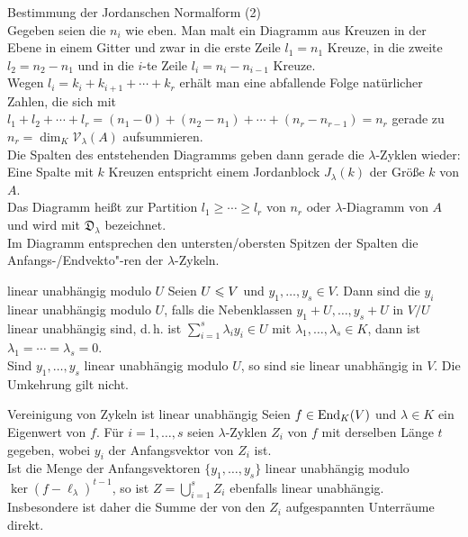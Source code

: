 \begin{Prozedur}{Bestimmung der Jordanschen Normalform (2)} \\
    Gegeben seien die $n_i$ wie eben.
    Man malt ein Diagramm aus Kreuzen in der Ebene in einem Gitter
    und zwar in die erste Zeile $l_1 = n_1$ Kreuze, in die zweite
    $l_2 = n_2 - n_1$ und in die $i$-te Zeile
    $l_i = n_i - n_{i-1}$ Kreuze. \\
    Wegen $l_i = k_i + k_{i+1} + \dotsb + k_r$ erhält man eine abfallende
    Folge natürlicher Zahlen, die sich mit $l_1 + l_2 + \dotsb + l_r =
    (n_1 - 0) + (n_2 - n_1) + \dotsb + (n_r - n_{r-1}) = n_r$ gerade zu
    $n_r = \dim_K \mathcal{V}_\lambda(A)$ aufsummieren. \\
    Die Spalten des entstehenden Diagramms geben dann gerade
    die $\lambda$-Zyklen wieder:
    Eine Spalte mit $k$ Kreuzen entspricht einem Jordanblock $J_\lambda(k)$
    der Größe $k$ von $A$. \\
    Das Diagramm heißt 
    zur Partition $l_1 \ge \dotsb \ge l_r$ von $n_r$ oder
    $\lambda$-Diagramm von $A$ und wird mit $\mathfrak{D}_\lambda$
    bezeichnet. \\
    Im Diagramm entsprechen den untersten/obersten Spitzen der Spalten
    die Anfangs-/Endvekto"-ren der $\lambda$-Zykeln.
\end{Prozedur}

\begin{Def}{linear unabhängig modulo $U$}
    Seien $U \leqslant V$ und $y_1, \dotsc, y_s \in V$.
    Dann sind die $y_i$ linear unabhängig modulo $U$, falls die
    Nebenklassen $y_1 + U, \dotsc, y_s + U$ in $V/U$ linear unabhängig sind,
    d.\,h. ist $\sum_{i=1}^s \lambda_i y_i \in U$ mit
    $\lambda_1, \dotsc, \lambda_s \in K$, dann ist
    $\lambda_1 = \dotsb = \lambda_s = 0$. \\
    Sind $y_1, \dotsc, y_s$ linear unabhängig modulo $U$, so sind sie
    linear unabhängig in $V$.
    Die Umkehrung gilt nicht.
\end{Def}

\begin{Satz}{Vereinigung von Zykeln ist linear unabhängig}
    Seien $f \in \operatorname{End}_K(V)$ und $\lambda \in K$ ein Eigenwert von $f$.
    Für $i = 1, \dotsc, s$ seien $\lambda$-Zyklen $Z_i$ von $f$ mit derselben
    Länge $t$ gegeben, wobei $y_i$ der Anfangsvektor von $Z_i$ ist. \\
    Ist die Menge der Anfangsvektoren $\{y_1, \dotsc, y_s\}$ linear
    unabhängig modulo $\ker(f - \ell_\lambda)^{t-1}$, so ist
    $Z = \bigcup_{i=1}^s Z_i$ ebenfalls linear unabhängig. \\
    Insbesondere ist daher die Summe der von den $Z_i$ aufgespannten
    Unterräume direkt.
\end{Satz}

